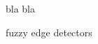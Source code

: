 \begin{thebibliography}{9}
        bla bla
        
        fuzzy edge detectors

\end{thebibliography} 